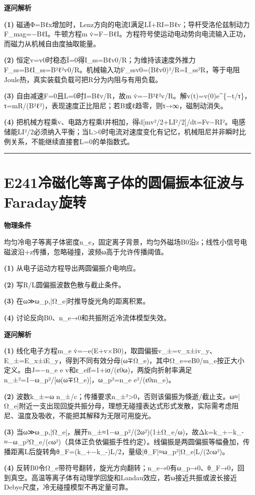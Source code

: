 \documentclass[UTF8,a4paper,11pt,oneside,openany]{ctexbook}
\begin{document}
\par\medskip\noindent\textbf{逐问解析}
\par\noindent\textbf{(1)} 磁通Φ=Bℓx增加时，Lenz方向的电流I满足LĪ+RI=Bℓv；导杆受洛伦兹制动力F\_mag=−BℓI。牛顿方程m v̇=F−BℓI。方程符号使运动电动势向电流输入正功，而磁力从机械自由度抽取能量。
\par\noindent\textbf{(2)} 恒定v=v0时稳态Ī=0得I\_ss=Bℓv0/R；为维持该速度外推力F\_ss=BℓI\_ss=B²ℓ²v0/R。机械输入功F\_ssv0=(Bℓv0)²/R=I\_ss²R，等于电阻Joule热，真实装载负载可把R分为内阻与有用负载。
\par\noindent\textbf{(3)} 自由减速F=0且L=0时I=Bℓv/R，故m v̇=−B²ℓ²v/R。解v(t)=v(0)e\textasciicircum{}\{−t/τ\}，τ=mR/(B²ℓ²)，表现速度正比阻尼；若B或ℓ趋零，则τ→∞，磁制动消失。
\par\noindent\textbf{(4)} 把机械方程乘v、电路方程乘I并相加，得d[mv²/2+LI²/2]/dt=Fv−RI²。电感储能LI²/2必须纳入平衡；当L>0时电流对速度变化有记忆，机械阻尼并非瞬时比例关系，不能继续直接套L=0的单指数式。

\par\bigskip\hrule\bigskip
\section*{E241\quad 冷磁化等离子体的圆偏振本征波与Faraday旋转}
\textbf{物理条件}\par 均匀冷电子等离子体密度n\_e，固定离子背景，均匀外磁场B0沿z；线性小信号电磁波沿+z传播，忽略碰撞，波频ω高于允许传播阈值。
\par\noindent\textbf{(1)} 从电子运动方程导出两圆偏振介电响应。
\par\noindent\textbf{(2)} 写R/L圆偏振波数色散与截止条件。
\par\noindent\textbf{(3)} 在ω≫ω\_p,|Ω\_e|时推导旋光角的距离积累。
\par\noindent\textbf{(4)} 讨论反向B0、n\_e→0和共振附近冷流体模型失效。

\par\medskip\noindent\textbf{逐问解析}
\par\noindent\textbf{(1)} 线化电子方程m\_e v̇=−e(E+v×B0)，取圆偏振v\_±=v\_x±iv\_y、E\_±=E\_x±iE\_y，得到不同有效分母(ω∓Ω\_e)，其中Ω\_e=eB0/m\_e按正大小定义。由J=−n\_e e v和ε\_eff=1+iσ/(ε0ω)，两旋向折射率满足n\_±²=1−ω\_p²/[ω(ω∓Ω\_e)]，ω\_p²=n\_e e²/(ε0m\_e)。
\par\noindent\textbf{(2)} 波数k\_±=ω n\_±/c；传播要求n\_±²>0，否则该偏振为倏逝/截止支。ω≈|Ω\_e|附近一支出现回旋共振分母，理想无碰撞表达式形式发散，实际需考虑阻尼、温度及吸收，不能把其解释为无限可用旋光。
\par\noindent\textbf{(3)} 当ω≫ω\_p,|Ω\_e|，展开n\_±≈1−ω\_p²/(2ω²)(1±Ω\_e/ω)，故Δk=k\_+−k\_-≈−ω\_p²Ω\_e/(cω²)（具体正负依偏振手性约定）。线偏振是两圆偏振等幅叠加，传播距离L后旋转角θ\_F=(k\_+−k\_-)L/2，量级|θ\_F|≈ω\_p²|Ω\_e|L/(2cω²)。
\par\noindent\textbf{(4)} 反转B0令Ω\_e带符号翻转，旋光方向翻转；n\_e→0有ω\_p→0、θ\_F→0，回到真空。高温等离子体有动理学回旋和Landau效应，若ω接近共振或波长接近Debye尺度，冷无碰撞模型不再定量可靠。
\end{document}
